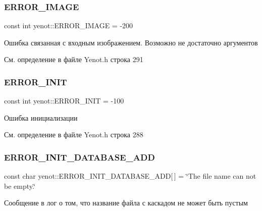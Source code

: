 \subsubsection{\texorpdfstring{E\+R\+R\+O\+R\+\_\+\+I\+M\+A\+GE}{ERROR\_IMAGE}}
{\footnotesize\ttfamily const int yenot\+::\+E\+R\+R\+O\+R\+\_\+\+I\+M\+A\+GE = -\/200}



Ошибка связанная с входным изображением. Возможно не достаточно аргументов 



См. определение в файле Yenot.\+h строка 291

\mbox{\label{namespaceyenot_a8206ed93e65c9e89395c2823a5f18786}} 
\subsubsection{\texorpdfstring{E\+R\+R\+O\+R\+\_\+\+I\+N\+IT}{ERROR\_INIT}}
{\footnotesize\ttfamily const int yenot\+::\+E\+R\+R\+O\+R\+\_\+\+I\+N\+IT = -\/100}



Ошибка инициализации 



См. определение в файле Yenot.\+h строка 288

\mbox{\label{namespaceyenot_af958287fcf5b41e632a87bd1a795c74b}} 
\subsubsection{\texorpdfstring{E\+R\+R\+O\+R\+\_\+\+I\+N\+I\+T\+\_\+\+D\+A\+T\+A\+B\+A\+S\+E\+\_\+\+A\+DD}{ERROR\_INIT\_DATABASE\_ADD}}
{\footnotesize\ttfamily const char yenot\+::\+E\+R\+R\+O\+R\+\_\+\+I\+N\+I\+T\+\_\+\+D\+A\+T\+A\+B\+A\+S\+E\+\_\+\+A\+DD\mbox{[}$\,$\mbox{]} = \char`\"{}The file name can not be empty.\char`\"{}}



Сообщение в лог о том, что название файла с каскадом не может быть пустым 



